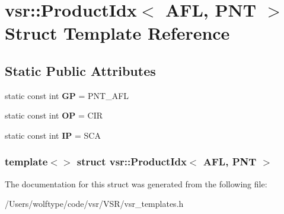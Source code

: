 \hypertarget{structvsr_1_1_product_idx_3_01_a_f_l_00_01_p_n_t_01_4}{\section{vsr\-:\-:Product\-Idx$<$ A\-F\-L, P\-N\-T $>$ Struct Template Reference}
\label{structvsr_1_1_product_idx_3_01_a_f_l_00_01_p_n_t_01_4}
}
\subsection*{Static Public Attributes}
\begin{DoxyCompactItemize}
\item 
\hypertarget{structvsr_1_1_product_idx_3_01_a_f_l_00_01_p_n_t_01_4_a7a22fdf78bfd32ee6511bac5f6c2c87e}{static const int {\bfseries G\-P} = P\-N\-T\-\_\-\-A\-F\-L}\label{structvsr_1_1_product_idx_3_01_a_f_l_00_01_p_n_t_01_4_a7a22fdf78bfd32ee6511bac5f6c2c87e}

\item 
\hypertarget{structvsr_1_1_product_idx_3_01_a_f_l_00_01_p_n_t_01_4_a5cf432f2e0a25163e243a6371c97527a}{static const int {\bfseries O\-P} = C\-I\-R}\label{structvsr_1_1_product_idx_3_01_a_f_l_00_01_p_n_t_01_4_a5cf432f2e0a25163e243a6371c97527a}

\item 
\hypertarget{structvsr_1_1_product_idx_3_01_a_f_l_00_01_p_n_t_01_4_ab1995e236028c8b34c9c9ad279acfef6}{static const int {\bfseries I\-P} = S\-C\-A}\label{structvsr_1_1_product_idx_3_01_a_f_l_00_01_p_n_t_01_4_ab1995e236028c8b34c9c9ad279acfef6}

\end{DoxyCompactItemize}
\subsubsection*{template$<$$>$ struct vsr\-::\-Product\-Idx$<$ A\-F\-L, P\-N\-T $>$}



The documentation for this struct was generated from the following file\-:\begin{DoxyCompactItemize}
\item 
/\-Users/wolftype/code/vsr/\-V\-S\-R/vsr\-\_\-templates.\-h\end{DoxyCompactItemize}
